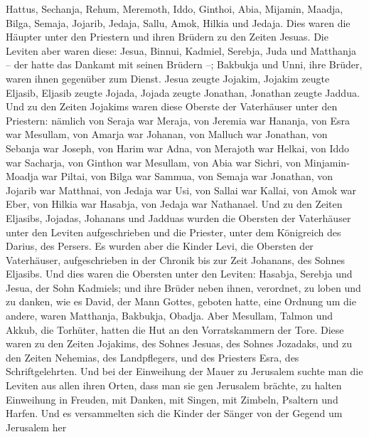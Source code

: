 Hattus,  Sechanja, Rehum, Meremoth,  Iddo,
Ginthoi, Abia,  Mijamin, Maadja, Bilga,  Semaja,
Jojarib, Jedaja,  Sallu, Amok, Hilkia und Jedaja. Dies waren
die Häupter unter den Priestern und ihren Brüdern zu den Zeiten Jesuas.
 Die Leviten aber waren diese: Jesua, Binnui, Kadmiel,
Serebja, Juda und Matthanja -- der hatte das Dankamt mit seinen Brüdern
--;  Bakbukja und Unni, ihre Brüder, waren ihnen gegenüber
zum Dienst.  Jesua zeugte Jojakim, Jojakim zeugte Eljasib,
Eljasib zeugte Jojada,  Jojada zeugte Jonathan, Jonathan
zeugte Jaddua.  Und zu den Zeiten Jojakims waren diese
Oberste der Vaterhäuser unter den Priestern: nämlich von Seraja war
Meraja, von Jeremia war Hananja,  von Esra war Mesullam,
von Amarja war Johanan,  von Malluch war Jonathan, von
Sebanja war Joseph,  von Harim war Adna, von Merajoth war
Helkai,  von Iddo war Sacharja, von Ginthon war Mesullam,
 von Abia war Sichri, von Minjamin-Moadja war Piltai,
 von Bilga war Sammua, von Semaja war Jonathan,
 von Jojarib war Matthnai, von Jedaja war Usi,
 von Sallai war Kallai, von Amok war Eber, 
von Hilkia war Hasabja, von Jedaja war Nathanael.  Und zu
den Zeiten Eljasibs, Jojadas, Johanans und Jadduas wurden die Obersten
der Vaterhäuser unter den Leviten aufgeschrieben und die Priester, unter
dem Königreich des Darius, des Persers.  Es wurden aber die
Kinder Levi, die Obersten der Vaterhäuser, aufgeschrieben in der Chronik
bis zur Zeit Johanans, des Sohnes Eljasibs.  Und dies waren
die Obersten unter den Leviten: Hasabja, Serebja und Jesua, der Sohn
Kadmiels; und ihre Brüder neben ihnen, verordnet, zu loben und zu
danken, wie es David, der Mann Gottes, geboten hatte, eine Ordnung um
die andere,  waren Matthanja, Bakbukja, Obadja. Aber
Mesullam, Talmon und Akkub, die Torhüter, hatten die Hut an den
Vorratskammern der Tore.  Diese waren zu den Zeiten
Jojakims, des Sohnes Jesuas, des Sohnes Jozadaks, und zu den Zeiten
Nehemias, des Landpflegers, und des Priesters Esra, des
Schriftgelehrten.  Und bei der Einweihung der Mauer zu
Jerusalem suchte man die Leviten aus allen ihren Orten, dass man sie gen
Jerusalem brächte, zu halten Einweihung in Freuden, mit Danken, mit
Singen, mit Zimbeln, Psaltern und Harfen.  Und es
versammelten sich die Kinder der Sänger von der Gegend um Jerusalem her
